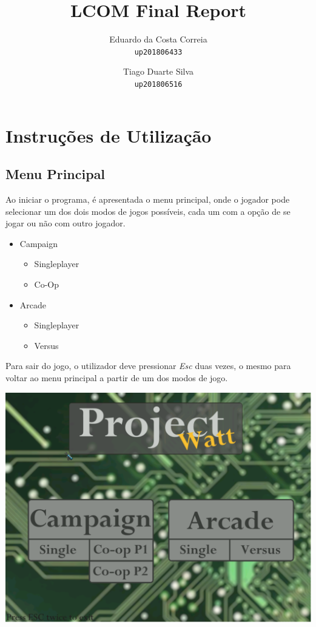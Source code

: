 \documentclass{report}
\begin{document}
\title{LCOM Final Report}
	\author{Eduardo da Costa Correia\\
	\texttt{up201806433}
	\and
	Tiago Duarte Silva\\
	\texttt{up201806516}}   
\maketitle

\tableofcontents

\chapter{Instruções de Utilização} 

\section{Menu Principal}

Ao iniciar o programa, é apresentada o menu principal, onde o jogador pode selecionar um dos dois modos de jogos possíveis, cada um com a opção de se jogar ou não com outro jogador.

\begin{itemize}
	\item Campaign

	\begin{itemize}
		\item Singleplayer 
		\item Co-Op
	\end{itemize}
	
	\item Arcade
	
	\begin{itemize}
		\item Singleplayer 
		\item Versus
	\end{itemize}
\end{itemize}

Para sair do jogo, o utilizador deve pressionar \textit{Esc} duas vezes, o mesmo para voltar ao menu principal a partir de um dos modos de jogo.

\includegraphics[width=\textwidth]{main_menu}
\end{document}
